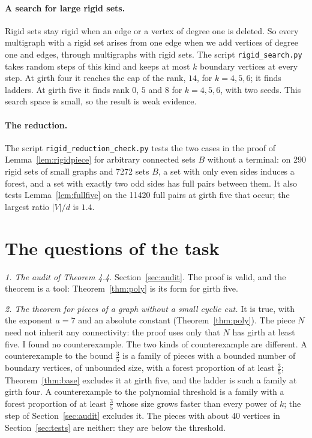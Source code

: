 \documentclass[11pt]{article}
\begin{document}
\paragraph{A search for large rigid sets.} Rigid sets stay rigid when an edge or a vertex of
degree one is deleted. So every multigraph with a rigid set arises from one edge when we add
vertices of degree one and edges, through multigraphs with rigid sets. The script
\texttt{rigid\_search.py} takes random steps of this kind and keeps at most $k$ boundary vertices
at every step. At girth four it reaches the cap of the rank, $14$, for $k=4,5,6$; it finds
ladders. At girth five it finds rank $0$, $5$ and $8$ for $k=4,5,6$, with two seeds. This search
space is small, so the result is weak evidence.

\paragraph{The reduction.} The script \texttt{rigid\_reduction\_check.py} tests the two cases in
the proof of Lemma~\ref{lem:rigidpiece} for arbitrary connected sets $B$ without a terminal: on
290 rigid sets of small graphs and 7272 sets $B$, a set with only even sides induces a forest,
and a set with exactly two odd sides has full pairs between them. It also tests
Lemma~\ref{lem:fullfive} on the 11420 full pairs at girth five that occur; the largest ratio
$|V|/d$ is $1.4$.

\section{The questions of the task}\label{sec:answers}

\emph{1. The audit of Theorem 4.4.} Section~\ref{sec:audit}. The proof is valid, and the theorem
is a tool: Theorem~\ref{thm:poly} is its form for girth five.

\emph{2. The theorem for pieces of a graph without a small cyclic cut.} It is true, with the
exponent $a=7$ and an absolute constant (Theorem~\ref{thm:poly}). The piece $N$ need not inherit
any connectivity: the proof uses only that $N$ has girth at least five. I found no
counterexample. The two kinds of counterexample are different. A counterexample to the bound
$\frac35$ is a family of pieces with a bounded number of boundary vertices, of unbounded size,
with a forest proportion of at least $\frac35$; Theorem~\ref{thm:base} excludes it at girth
five, and the ladder is such a family at girth four. A counterexample to the polynomial
threshold is a family with a forest proportion of at least $\frac35$ whose size grows faster
than every power of $k$; the step of Section~\ref{sec:audit} excludes it. The pieces with about
40 vertices in Section~\ref{sec:tests} are neither: they are below the threshold.
\end{document}
